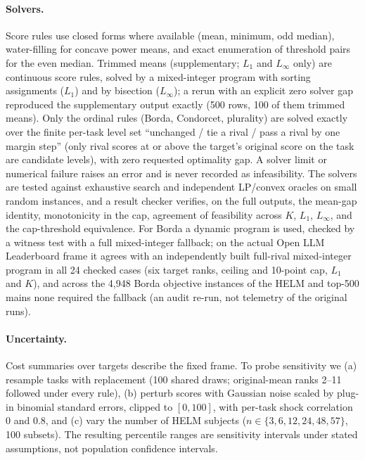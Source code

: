 \paragraph{Solvers.}
Score rules use closed forms where available (mean, minimum, odd median), water-filling for concave power means, and exact enumeration of threshold pairs for the even median. Trimmed means (supplementary; $L_1$ and $L_\infty$ only) are continuous score rules, solved by a mixed-integer program with sorting assignments ($L_1$) and by bisection ($L_\infty$); a rerun with an explicit zero solver gap reproduced the supplementary output exactly (500 rows, 100 of them trimmed means). Only the ordinal rules (Borda, Condorcet, plurality) are solved exactly over the finite per-task level set ``unchanged / tie a rival / pass a rival by one margin step'' (only rival scores at or above the target's original score on the task are candidate levels), with zero requested optimality gap. A solver limit or numerical failure raises an error and is never recorded as infeasibility. The solvers are tested against exhaustive search and independent LP/convex oracles on small random instances, and a result checker verifies, on the full outputs, the mean-gap identity, monotonicity in the cap, agreement of feasibility across $K$, $L_1$, $L_\infty$, and the cap-threshold equivalence. For Borda a dynamic program is used, checked by a witness test with a full mixed-integer fallback; on the actual Open LLM Leaderboard frame it agrees with an independently built full-rival mixed-integer program in all 24 checked cases (six target ranks, ceiling and 10-point cap, $L_1$ and $K$), and across the 4,948 Borda objective instances of the HELM and top-500 mains none required the fallback (an audit re-run, not telemetry of the original runs).

\paragraph{Uncertainty.}
Cost summaries over targets describe the fixed frame. To probe sensitivity we (a) resample tasks with replacement (100 shared draws; original-mean ranks 2--11 followed under every rule), (b) perturb scores with Gaussian noise scaled by plug-in binomial standard errors, clipped to $[0,100]$, with per-task shock correlation 0 and 0.8, and (c) vary the number of HELM subjects ($n\in\{3,6,12,24,48,57\}$, 100 subsets). The resulting percentile ranges are sensitivity intervals under stated assumptions, not population confidence intervals.

